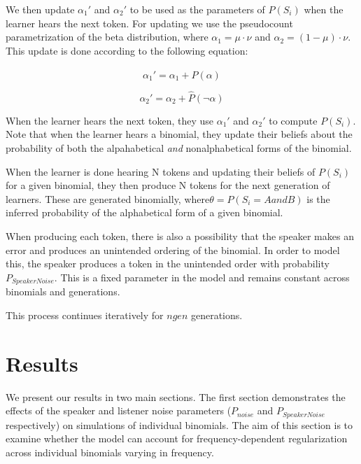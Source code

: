 \documentclass[10pt, letterpaper]{article}
\begin{document}
We then update \(\alpha_1'\) and \(\alpha_2'\) to be used as the
parameters of \(P(S_i)\) when the learner hears the next token. For
updating we use the pseudocount parametrization of the beta
distribution, where \(\alpha_1 = \mu \cdot \nu\) and
\(\alpha_2 = (1-\mu) \cdot \nu\). This update is done according to the
following equation:

\begin{equation}
\label{eq:alpha1}
\alpha_1' = \alpha_1 + \hat{P}(\alpha)
\end{equation}

\begin{equation}
\label{eq:alpha2}
\alpha_2' = \alpha_2 + \hat{P}(\neg\alpha)
\end{equation}

When the learner hears the next token, they use \(\alpha_1'\) and
\(\alpha_2'\) to compute \(P(S_i)\). Note that when the learner hears a
binomial, they update their beliefs about the probability of both the
alpahabetical \emph{and} nonalphabetical forms of the binomial.

When the learner is done hearing N tokens and updating their beliefs of
\(P(S_i)\) for a given binomial, they then produce N tokens for the next
generation of learners. These are generated binomially,
where\(\theta = P(S_i=AandB)\) is the inferred probability of the
alphabetical form of a given binomial.

When producing each token, there is also a possibility that the speaker
makes an error and produces an unintended ordering of the binomial. In
order to model this, the speaker produces a token in the unintended
order with probability \(P_{SpeakerNoise}\). This is a fixed parameter
in the model and remains constant across binomials and generations.

This process continues iteratively for \(ngen\) generations.

\hypertarget{results}{%
\section{Results}\label{results}}

We present our results in two main sections. The first section
demonstrates the effects of the speaker and listener noise parameters
(\(P_{noise}\) and \(P_{SpeakerNoise}\) respectively) on simulations of
individual binomials. The aim of this section is to examine whether the
model can account for frequency-dependent regularization across
individual binomials varying in frequency.
\end{document}
